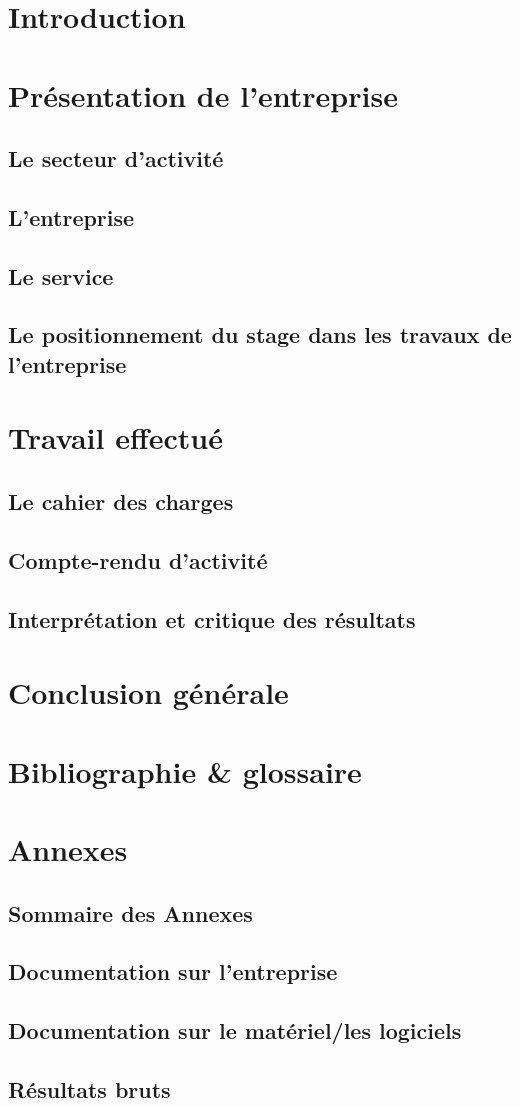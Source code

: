 \documentclass[a4paper, 11pt]{report}
\begin{document}
\chapter{Introduction}
\chapter{Présentation de l'entreprise}
  \section{Le secteur d'activité}
  \section{L'entreprise}
  \section{Le service}
  \section{Le positionnement du stage dans les travaux de l'entreprise}
\chapter{Travail effectué}
  \section{Le cahier des charges}
  \section{Compte-rendu d'activité}
  \section{Interprétation et critique des résultats}
\chapter{Conclusion générale}
\chapter{Bibliographie \& glossaire}
\chapter{Annexes}
  \section{Sommaire des Annexes}
  \section{Documentation sur l'entreprise}
  \section{Documentation sur le matériel/les logiciels}
  \section{Résultats bruts}
\end{document}

